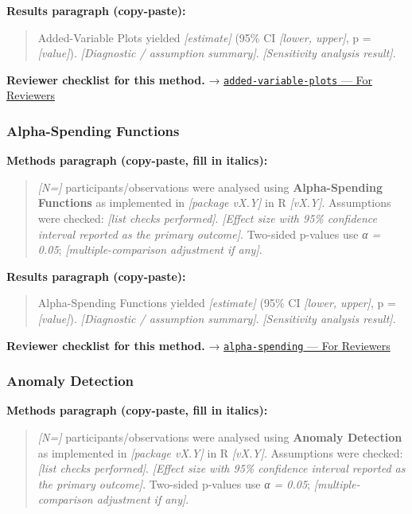\documentclass[
]{article}
\begin{document}
\textbf{Results paragraph (copy-paste):}

\begin{quote}
Added-Variable Plots yielded \emph{{[}estimate{]}} (95\% CI
\emph{{[}lower, upper{]}}, p = \emph{{[}value{]}}). \emph{{[}Diagnostic
/ assumption summary{]}}. \emph{{[}Sensitivity analysis result{]}}.
\end{quote}

\textbf{Reviewer checklist for this method.} →
\href{../chapters/07-regression/added-variable-plots.Rmd\#for-reviewers}{\texttt{added-variable-plots}
--- For Reviewers}

\subsubsection{Alpha-Spending Functions}\label{alpha-spending-functions}

\textbf{Methods paragraph (copy-paste, fill in italics):}

\begin{quote}
\emph{{[}N={]}} participants/observations were analysed using
\textbf{Alpha-Spending Functions} as implemented in \emph{{[}package
vX.Y{]}} in R \emph{{[}vX.Y{]}}. Assumptions were checked: \emph{{[}list
checks performed{]}}. \emph{{[}Effect size with 95\% confidence interval
reported as the primary outcome{]}}. Two-sided p-values use \emph{α =
0.05}; \emph{{[}multiple-comparison adjustment if any{]}}.
\end{quote}

\textbf{Results paragraph (copy-paste):}

\begin{quote}
Alpha-Spending Functions yielded \emph{{[}estimate{]}} (95\% CI
\emph{{[}lower, upper{]}}, p = \emph{{[}value{]}}). \emph{{[}Diagnostic
/ assumption summary{]}}. \emph{{[}Sensitivity analysis result{]}}.
\end{quote}

\textbf{Reviewer checklist for this method.} →
\href{../chapters/14-clinical/alpha-spending.Rmd\#for-reviewers}{\texttt{alpha-spending}
--- For Reviewers}

\subsubsection{Anomaly Detection}\label{anomaly-detection}

\textbf{Methods paragraph (copy-paste, fill in italics):}

\begin{quote}
\emph{{[}N={]}} participants/observations were analysed using
\textbf{Anomaly Detection} as implemented in \emph{{[}package vX.Y{]}}
in R \emph{{[}vX.Y{]}}. Assumptions were checked: \emph{{[}list checks
performed{]}}. \emph{{[}Effect size with 95\% confidence interval
reported as the primary outcome{]}}. Two-sided p-values use \emph{α =
0.05}; \emph{{[}multiple-comparison adjustment if any{]}}.
\end{quote}
\end{document}
